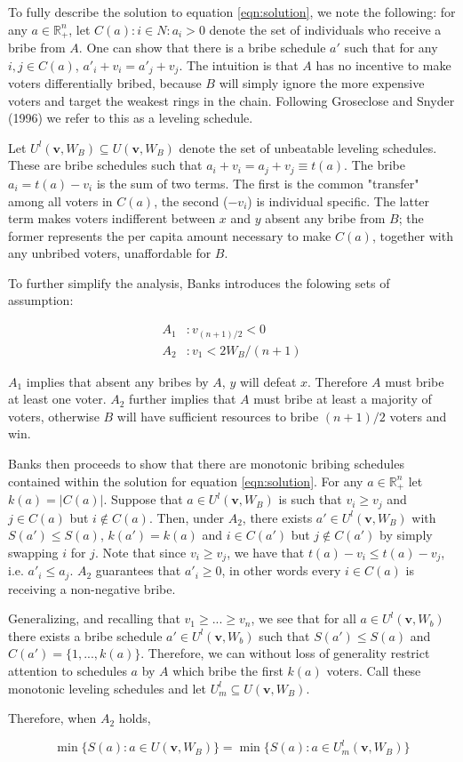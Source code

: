 \documentclass[12pt,a4paper]{article}
\newcommand{\real}{\mathbb{R}_+^n}
\begin{document}
To fully describe the solution to equation \ref{eqn:solution}, we note the following: for any $a \in \mathbb{R}_+^n$, let $C(a) : {i \in N : a_i > 0}$ denote the set of individuals who receive a bribe from $A$. One can show that there is a bribe schedule $a'$ such that for any $i,j \in C(a)$, $a'_i + v_i = a'_j + v_j$. The intuition is that $A$ has no incentive to make voters differentially bribed, because $B$ will simply ignore the more expensive voters and target the weakest rings in the chain. Following Groseclose and Snyder (1996) we refer to this as a leveling schedule.

Let $U^l(\mathbf{v}, W_B) \subseteq U(\mathbf{v}, W_B)$ denote the set of unbeatable leveling schedules. These are bribe schedules such that $a_i + v_i = a_j + v_j  \equiv t(a)$. The bribe $a_i = t(a) - v_i$ is the sum of two terms. The first is the common "transfer" among all voters in $C(a)$, the second ($-v_i$) is individual specific. The latter term makes voters indifferent between $x$ and $y$ absent any bribe from $B$; the former represents the per capita amount necessary to make $C(a)$, together with any unbribed voters, unaffordable for $B$.

To further simplify the analysis, Banks introduces the folowing sets of assumption:

\begin{align*}
    A_1 &: v_{(n+1)/2} < 0\\
    A_2 &: v_1 < 2W_B/(n+1) 
\end{align*}

$A_1$ implies that absent any bribes by $A$, $y$ will defeat $x$. Therefore $A$ must bribe at least one voter. $A_2$ further implies that $A$ must bribe at least a majority of voters, otherwise $B$ will have sufficient resources to bribe $(n+1)/2$ voters and win.

Banks then proceeds to show that there are monotonic bribing schedules contained within the solution for equation \ref{eqn:solution}. For any $a \in \real$ let $k(a) = \lvert C(a) \rvert$. Suppose that $a\in U^l(\mathbf{v}, W_B)$ is such that $v_i \geq v_j$ and $j \in C(a)$ but $i \notin C(a)$. Then, under $A_2$, there exists $a' \in U^l(\mathbf{v}, W_B)$ with $S(a') \leq S(a)$, $k(a') = k(a)$ and $i \in C(a')$ but $j \notin C(a')$ by simply swapping $i$ for $j$. Note that since $v_i \geq v_j$, we have that $t(a) - v_i \leq  t(a) - v_j$, i.e. $a'_i \leq a_j$. $A_2$ guarantees that $a'_i \geq 0$, in other words every $i \in C(a)$ is receiving a non-negative bribe.

Generalizing, and recalling that $v_1 \geq ... \geq v_n$, we see that for all $a \in U^l(\mathbf{v}, W_b)$ there exists a bribe schedule $a' \in U^l(\mathbf{v}, W_b)$ such that $S(a') \leq S(a)$ and $C(a') = \{1, ..., k(a)\}$. Therefore, we can without loss of generality restrict attention to schedules $a$ by $A$ which bribe the first $k(a)$ voters. Call these monotonic leveling schedules and let $U_m^l \subseteq U(\mathbf{v}, W_B)$.

Therefore, when $A_2$ holds,

$$\min\{S(a): a \in U(\mathbf{v}, W_B)\} = \min\{S(a): a \in U^l_m(\mathbf{v}, W_B)\}$$
\end{document}
